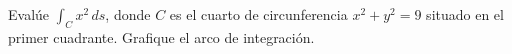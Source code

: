 Evalúe $\int_C x^2\,ds$, donde $C$ es el cuarto de circunferencia $x^2+y^2=9$ situado en el primer cuadrante. Grafique el arco de integración.
